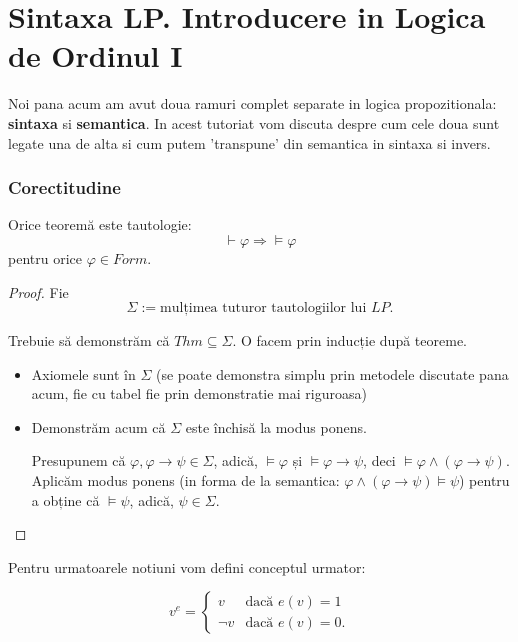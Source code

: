 \chapter{Sintaxa LP. Introducere in Logica de Ordinul I}

Noi pana acum am avut doua ramuri complet separate in logica propozitionala: \textbf{sintaxa} si \textbf{semantica}.
In acest tutoriat vom discuta despre cum cele doua sunt legate una de alta si cum putem 'transpune' din semantica in sintaxa si invers.

\subsection{Corectitudine}

\begin{theorem}
    Orice teoremă este tautologie:
    \[
        \vdash \varphi \Rightarrow \models \varphi
    \]
    pentru orice \( \varphi \in Form \).
\end{theorem}

\begin{proof}
    Fie
    \[
        \Sigma := \text{mulțimea tuturor tautologiilor lui } LP.
    \]

    Trebuie să demonstrăm că \( Thm \subseteq \Sigma \). O facem prin inducție după teoreme.
    \begin{itemize}
        \item Axiomele sunt în \( \Sigma \) (se poate demonstra simplu prin metodele discutate pana acum, fie cu tabel fie prin demonstratie mai riguroasa)
        \item Demonstrăm acum că \( \Sigma \) este închisă la modus ponens.

              Presupunem că \( \varphi, \varphi \to \psi \in \Sigma \), adică, \( \models \varphi \) și \( \models \varphi \to \psi \), deci \break
              \( \models \varphi \land (\varphi \to \psi) \). Aplicăm modus ponens (in forma de la semantica: \break \( \varphi \land (\varphi \to \psi) \models \psi \)) pentru a obține că \( \models \psi \), adică, \( \psi \in \Sigma \).
    \end{itemize}
\end{proof}

Pentru urmatoarele notiuni vom defini conceptul urmator:


\[
    v^e = \begin{cases}
        v & \text{dacă } e(v) = 1 \\
        \neg v & \text{dacă } e(v) = 0.
    \end{cases}
\]

